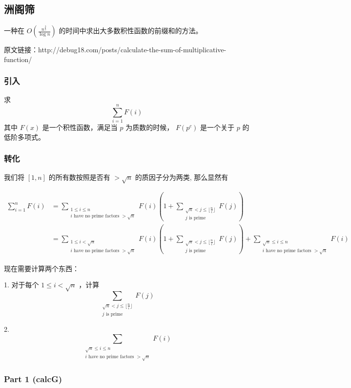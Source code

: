 \documentclass{article}
\begin{document}
\subsection{洲阁筛}

一种在 $O(\frac{n^{\frac{3}{4}}}{\log n})$ 的时间中求出大多数积性函数的前缀和的方法。

原文链接：http://debug18.com/posts/calculate-the-sum-of-multiplicative-function/

\subsubsection*{引入}

求 $$\sum\limits_{i = 1}^{n} F(i)$$ 其中 $F(x)$ 是一个积性函数，满足当 $p$ 为质数的时候， $F(p^c)$ 是一个关于 $p$ 的低阶多项式。

\subsubsection*{转化}

我们将 $[1,n]$ 的所有数按照是否有 $>\sqrt{n}$ 的质因子分为两类, 那么显然有

$$
\begin{aligned}
\sum_{i = 1}^{n} F(i) & = \sum_{\substack{1 \le i \le n \\ i \text{ have no prime factors } > \sqrt{n} }} F(i) \left( 1 + \sum_{\substack{\sqrt{n} < j \le \lfloor \frac{n}{i} \rfloor \\ j \text{ is prime}}} F(j) \right) \\
& = \sum_{\substack{1 \le i < \sqrt{n} \\ i \text{ have no prime factors } > \sqrt{n} }} F(i) \left( 1 + \sum_{\substack{\sqrt{n} < j \le \lfloor \frac{n}{i} \rfloor \\ j \text{ is prime}}} F(j) \right) +
 \sum_{\substack{\sqrt{n} \leq i \le n \\ i \text{ have no prime factors } > \sqrt{n} }} F(i)
\end{aligned}
$$

现在需要计算两个东西：

1. 对于每个 $1 \leq i < \sqrt{n}$ ，计算 $$\sum_{\substack{\sqrt{n} < j \le \lfloor \frac{n}{i} \rfloor \\ j \text{ is prime}}} F(j)$$

2. $$\sum_{\substack{\sqrt{n} \le i \le n \\ i \text{ have no prime factors } > \sqrt{n} }} F(i)$$

\subsubsection*{Part 1 (calcG)}
\end{document}
